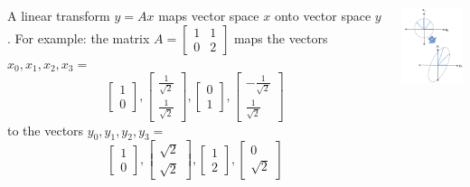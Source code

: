 \documentclass{beamer}
\begin{document}
\begin{frame}
  \begin{columns}[t]
    \column{2.75in}
    \begin{block}{}
      A linear transform ${y}=A{x}$ maps vector space ${x}$
      onto vector space ${y}$.  For example: the matrix
      $A=\left[\begin{array}{cc}1 & 1\\0&2\end{array}\right]$
      maps the vectors ${x}_0,{x}_1,{x}_2,{x}_3=$
      \[
      \left[\begin{array}{c}1\\0\end{array}\right],
      \left[\begin{array}{c}\frac{1}{\sqrt{2}}\\\frac{1}{\sqrt{2}}\end{array}\right],
      \left[\begin{array}{c}0\\1\end{array}\right],
      \left[\begin{array}{c}-\frac{1}{\sqrt{2}}\\\frac{1}{\sqrt{2}}\end{array}\right]
      \]
      to the vectors
      ${y}_0,{y}_1,{y}_2,{y}_3=$
      \[
      \left[\begin{array}{c}1\\0\end{array}\right],
      \left[\begin{array}{c}\sqrt{2}\\\sqrt{2}\end{array}\right],
      \left[\begin{array}{c}1\\2\end{array}\right],
      \left[\begin{array}{c}0\\\sqrt{2}\end{array}\right]
      \]
    \end{block}
    \column{1.5in}
    \begin{block}{}
      \includegraphics[width=1.45in]{linalg_review_fig1.png}
    \end{block}
  \end{columns}
\end{frame}
\end{document}
